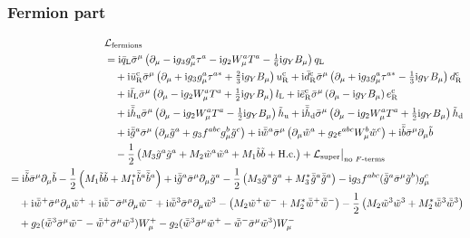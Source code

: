 \documentclass[CheatSheet]{subfiles}
\begin{document}
\subsubsection{Fermion part}
\begin{align}
 \begin{split}
  &\mathcal L\w{fermions}\\
&=
    \ii\bqL\bsigma^\mu \left(\partial_\mu - \ii g_3 g_\mu^a\tau^a - \ii g_2 W_\mu^a T^a - \tfrac16 \ii g_Y B_\mu\right)\qL
\\&\quad
 +  \ii\buR^\cc\bsigma^\mu \left(\partial_\mu + \ii g_3 g_\mu^a\tau^{a*} + \tfrac23 \ii g_Y B_\mu\right)\uR^\cc
 +  \ii\bdR^\cc\bsigma^\mu\left(\partial_\mu + \ii g_3 g_\mu^a\tau^{a*} - \tfrac13 \ii g_Y B_\mu\right)\dR^\cc
\\&\quad
 +  \ii\blL\bsigma^\mu \left(\partial_\mu - \ii g_2 W_\mu^aT^a + \tfrac12 \ii g_Y B_\mu\right)\lL
 +  \ii\beR^\cc\bsigma^\mu\left(\partial_\mu - \ii g_Y B_\mu\right)\eR^\cc
\\&\quad
 +  \ii\bthu\bsigma^\mu\left(\partial_\mu - \ii g_2 W_\mu^aT^a - \tfrac12 \ii g_Y B_\mu\right)\thu
 +  \ii\bthd\bsigma^\mu\left(\partial_\mu - \ii g_2 W_\mu^aT^a + \tfrac12 \ii g_Y B_\mu\right)\thd
\\&\quad
 + \ii\bar\tig^a\bsigma^\mu\left(\partial_\mu\tig^a + g_3f^{abc}g_\mu^b\tig^c\right)
 + \ii\bar\tiw^a\bsigma^\mu\left(\partial_\mu\tiw^a + g_2\epsilon^{abc}W^b_\mu\tiw^c\right)
 + \ii\bar\tib\bsigma^\mu\partial_\mu\tib
\\&\quad
 - \frac12\left(M_3\tig^a\tig^a+M_2\tiw^a\tiw^a+M_1\tib\tib+\text{H.c.}\right)
 + \mathcal L\w{super}\big|_{\text{no $F$-terms}}
 \end{split}
\\
\begin{split}
&=
 \ii\bar\tib\bsigma^\mu\partial_\mu\tib - \frac12\left(M_1\tib\tib+M_1^*\bar\tib^a\bar\tib^a\right)
 + \ii\bar\tig^a\bsigma^\mu\partial_\mu\tig^a - \frac12\left(M_3\tig^a\tig^a+M_3^*\bar\tig^a\bar\tig^a\right)
 - \ii g_3 f^{abc} (\bar\tig^a\bsigma^\mu\tig^b) g_\mu^c
\\&\quad
 + \ii\bar\tiw^+\bsigma^\mu \partial_\mu\tiw^+
 + \ii\bar\tiw^-\bsigma^\mu \partial_\mu\tiw^-
 + \ii\bar\tiw^3\bsigma^\mu \partial_\mu\tiw^3
 -\left(M_2\tiw^+\tiw^- + M_2^*\bar\tiw^+\bar\tiw^-\right)
 -\frac12\left(M_2\tiw^3\tiw^3 + M_2^*\bar\tiw^3\bar\tiw^3\right)
\\&\quad
 + g_2(\bar{\tiw}^{3}\bsigma^\mu\tiw^{-} - \bar{\tiw}^{+}\bsigma^\mu\tiw^{3})W_{\mu}^{+}
 - g_2(\bar{\tiw}^{3}\bsigma^\mu\tiw^{+} - \bar{\tiw}^{-}\bsigma^\mu\tiw^{3})W_{\mu}^{-}

\end{split}
\end{align}
\end{document}
